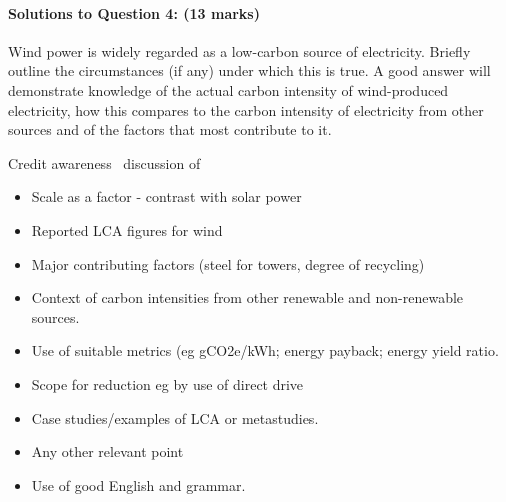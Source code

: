 \documentclass[a4paper,12pt,fleqn]{article}
\begin{document}
\paragraph{\textbf{Solutions to Question 4: (13 marks)}}
Wind power is widely regarded as a low-carbon source of electricity. Briefly outline the circumstances (if any) under which this is true.
A good answer will demonstrate knowledge of the actual carbon intensity of wind-produced electricity, how this compares to the carbon intensity 
of electricity from other sources and of the factors that most contribute to it.\par
Credit awareness \ discussion of 
\begin{itemize}
\item Scale as a factor - contrast with solar power
\item Reported LCA figures for wind
\item Major contributing factors (steel for towers, degree of recycling)
\item Context of carbon intensities from other renewable and non-renewable sources.
\item Use of suitable metrics (eg gCO2e/kWh; energy payback; energy yield ratio.
\item Scope for reduction eg by use of direct drive
\item Case studies/examples of LCA or metastudies.
\item Any other relevant point
\item Use of good English and grammar.
\end{itemize}


\end{document}
